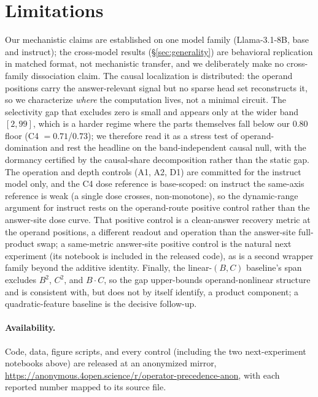 \section*{Limitations}

Our mechanistic claims are established on one model family (Llama-3.1-8B, base and instruct); the
cross-model results (\S\ref{sec:generality}) are behavioral replication in matched format, not
mechanistic transfer, and we deliberately make no cross-family dissociation claim. The causal
localization is distributed: the operand positions carry the answer-relevant signal but no sparse
head set reconstructs it, so we characterize \emph{where} the computation lives, not a minimal
circuit. The selectivity gap that excludes zero is small and appears only at the wider band
$[2,99]$, which is a harder regime where the parts themselves fall below our $0.80$ floor
(C4 $= 0.71$/$0.73$); we therefore read it as a stress test of operand-domination and rest the
headline on the band-independent causal null, with the dormancy certified by the causal-share
decomposition rather than the static gap. The operation and depth controls (A1, A2, D1) are
committed for the instruct model only, and the C4 dose reference is base-scoped: on instruct the
same-axis reference is weak (a single dose crosses, non-monotone), so the dynamic-range argument
for instruct rests on the operand-route positive control rather than the answer-site dose curve.
That positive control is a clean-answer recovery metric at the operand positions, a different
readout and operation than the answer-site full-product swap; a same-metric answer-site positive
control is the natural next experiment (its notebook is included in the released code), as is a
second wrapper family beyond the additive identity. Finally, the linear-$(B,C)$ baseline's span
excludes $B^2$, $C^2$, and $B\!\cdot\!C$, so the gap upper-bounds operand-nonlinear structure and
is consistent with, but does not by itself identify, a product component; a quadratic-feature
baseline is the decisive follow-up.

\paragraph{Availability.} Code, data, figure scripts, and every control (including the two
next-experiment notebooks above) are released at an anonymized mirror,
\url{https://anonymous.4open.science/r/operator-precedence-anon}, with each reported number mapped
to its source file.
